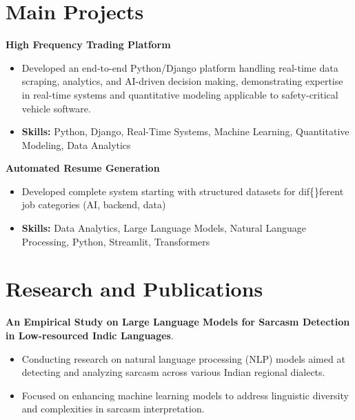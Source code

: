 \documentclass[a4paper,11pt]{article}
\begin{document}
\section{\textbf{Main Projects}}

\vspace{1mm}
  \textbf{High Frequency Trading Platform  }
\vspace{-1.5mm} %
\begin{itemize}
  \item Developed an end-to-end Python/Django platform handling real-time data scraping, analytics, and AI-driven decision making, demonstrating expertise in real-time systems and quantitative modeling applicable to safety-critical vehicle software.
\vspace{-3mm}
  \item \textbf{Skills:} Python, Django, Real-Time Systems, Machine Learning, Quantitative Modeling, Data Analytics
\end{itemize}


\vspace{1mm}
   \textbf{Automated Resume Generation }
\vspace{-1.5mm} %
\begin{itemize}
  \item Developed complete system starting with structured datasets for dif\{\}ferent job categories (AI, backend, data)
\vspace{-3mm}
  \item \textbf{Skills:} Data Analytics, Large Language Models, Natural Language Processing, Python, Streamlit, Transformers
\end{itemize}



\section{\textbf{Research and Publications} \hfill }
\vspace{1mm}
  \textbf{An Empirical Study on Large Language Models for Sarcasm Detection in Low-resourced Indic Languages}.
\vspace{-1mm} %
\begin{itemize}
  \item Conducting research on natural language processing (NLP) models aimed at detecting and analyzing sarcasm across various Indian regional dialects.
\vspace{-3mm}
  \item Focused on enhancing machine learning models to address linguistic diversity and complexities in sarcasm interpretation.
\end{itemize}
\end{document}
